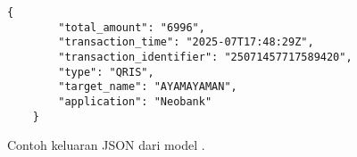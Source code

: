 \begin{figure}[htbp]
    \begin{lstlisting}[style=jsonstyle]
    {
        "total_amount": "6996",
        "transaction_time": "2025-07T17:48:29Z",
        "transaction_identifier": "25071457717589420",
        "type": "QRIS",
        "target_name": "AYAMAYAMAN",
        "application": "Neobank"
    }
    \end{lstlisting}
    \caption{Contoh keluaran JSON dari model \donut.}
    \label{fig:json-output}
\end{figure}
